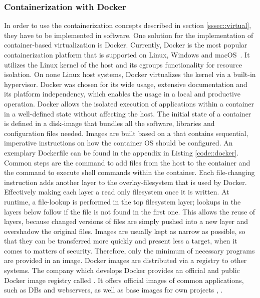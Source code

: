         \subsubsection{Containerization with Docker}\label{sssec::docker}
        In order to use the containerization concepts described in section \ref{sssec::virtual}, they have to be implemented in software. One solution for the implementation of container-based virtualization is Docker. Currently, Docker is the most popular containerization platform that is supported on Linux, Windows and macOS~\cite{docker_share}. It utilizes the Linux kernel of the host and its cgroups functionality for resource isolation. On none Linux host systems, Docker virtualizes the kernel via a built-in hypervisor. Docker was chosen for its wide usage, extensive documentation and its platform independency, which enables the usage in a local and productive operation.\newline
        Docker allows the isolated execution of applications within a container in a well-defined state without affecting the host. The initial state of a container is defined in a disk-image that bundles all the software, libraries and configuration files needed. Images are built based on a  that contains sequential, imperative instructions on how the container \ac{OS} should be configured. An exemplary Dockerfile can be found in the appendix in Listing \ref{code::docker}. Common steps are the  command to add files from the host to the container and the  command to execute shell commands within the container. Each file-changing instruction adds another layer to the overlay-filesystem that is used by Docker. Effectively making each layer a read only filesystem once it is written. At runtime, a file-lookup is performed in the top filesystem layer; lookups in the layers below follow if the file is not found in the first one. This allows the reuse of layers, because changed versions of files are simply pushed into a new layer and overshadow the original files. Images are usually kept as narrow as possible, so that they can be transferred more quickly and  present less a target, when it comes to matters of security. Therefore, only the minimum of necessary programs are provided in an image. Docker images are distributed via a registry to other systems. The company which develops Docker provides an official and public Docker image registry called . It offers official images of common applications, such as \acl{DB}s and webservers, as well as base images for own projects \cite{docker2020}, \cite{dockerdocs}.\newpage
